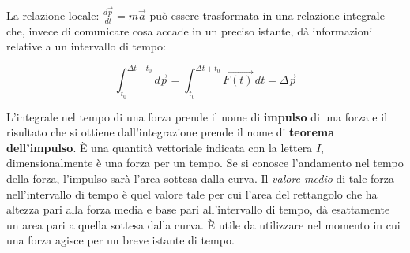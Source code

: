 La relazione locale: $\frac{d\vec{p}}{dt}=m\vec{a}$ può essere trasformata in una relazione integrale che, invece di comunicare cosa accade in un preciso istante, dà informazioni relative a un intervallo di tempo:

\[
	\boxed{\int_{t_0}^{\Delta t +t_0} d\vec{p}=\int_{t_0}^{\Delta t +t_0} \vec{F(t)}\,dt=\Delta \vec{p}}
\]

L'integrale nel tempo di una forza prende il nome di \textbf{impulso} di una forza e il risultato che si ottiene dall'integrazione prende il nome di \textbf{teorema dell'impulso}. È una quantità vettoriale indicata con la lettera $I$, dimensionalmente è una forza per un tempo. Se si conosce l'andamento nel tempo della forza, l'impulso sarà l'area sottesa dalla curva. Il \emph{valore medio} di tale forza nell'intervallo di tempo è quel valore tale per cui l'area del rettangolo che ha altezza pari alla forza media e base pari all'intervallo di tempo, dà esattamente un area pari a quella sottesa dalla curva. È utile da utilizzare nel momento in cui una forza agisce per un breve istante di tempo.

